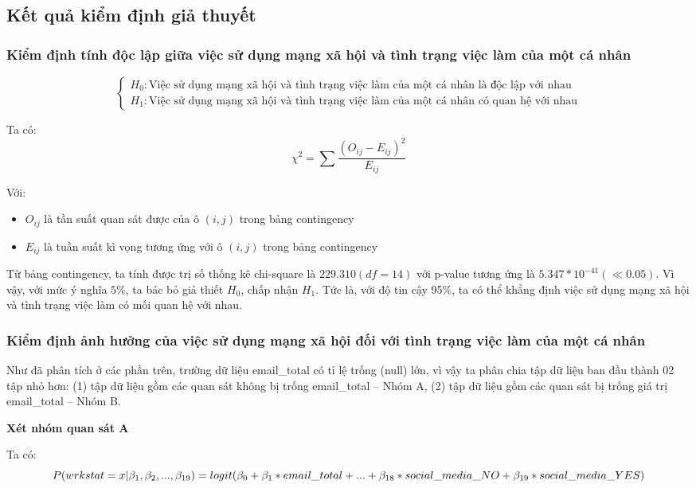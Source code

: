 \subsection{Kết quả kiểm định giả thuyết}
\subsubsection{Kiểm định tính độc lập giữa việc sử dụng mạng xã hội và tình trạng việc làm của một cá nhân}
$$
\left\{\begin{array}{l}
H_{0}: \text{Việc sử dụng mạng xã hội và tình trạng việc làm của một cá nhân là độc lập với nhau}\\
H_{1}: \text{Việc sử dụng mạng xã hội và tình trạng việc làm của một cá nhân có quan hệ với nhau}
\end{array}\right.
$$

Ta có:
$$
\chi^{2}=\sum \frac{\left(O_{i j}-E_{i j}\right)^{2}}{E_{i j}}
$$

Với:
\begin{itemize}
    \item $O_{i j}$ là tần suất quan sát được của ô $(i, j)$ trong bảng contingency
    \item $E_{i j}$ là tuần suất kì vọng tương ứng với ô $(i, j)$ trong bảng contingency
\end{itemize}

Từ bảng contingency, ta tính được trị số thống kê chi-square là $229.310(df=14)$ với p-value tương ứng là $5.347 * 10^{-41}(\ll 0.05)$. Vì vậy, với mức ý nghĩa $5 \%$, ta bác bỏ giả thiết $H_{0}$, chấp nhận $H_{1}$. Tức là, với độ tin cậy 95\%, ta có thể khẳng định việc sử dụng mạng xã hội và tình trạng việc làm có mối quan hệ với nhau.

\subsubsection{Kiểm định ảnh hưởng của việc sử dụng mạng xã hội đối với tình trạng việc làm của một cá nhân}
Như đã phân tích ở các phần trên, trường dữ liệu email\_total có tỉ lệ trống (null) lớn, vì vậy ta phân chia tập dữ liệu ban đầu thành 02 tập nhỏ hơn: (1) tập dữ liệu gồm các quan sát không bị trống email\_total – Nhóm A, (2) tập dữ liệu gồm các quan sát bị trống giá trị email\_total – Nhóm B.

\textbf{Xét nhóm quan sát A}

Ta có:
$$
    P(wrkstat = x | \beta_1, \beta_2,..., \beta_{19}) = \\ logit(\beta_0 + \beta_1 * email\_total + ... + \beta_{18} * social\_media\_NO
    + \beta_{19} * social\_media\_YES)
$$

